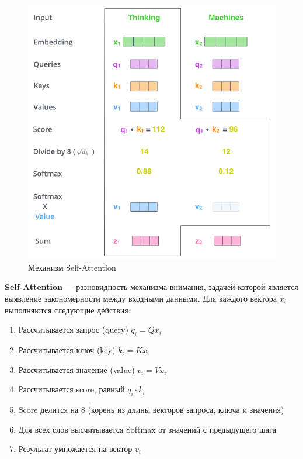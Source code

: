 \begin{figure}
    \centering
    \includegraphics[scale=0.5]{images/self-attention.png}
    \caption{Механизм Self-Attention}
\end{figure}

\begin{definition}
    \textbf{Self-Attention} --- разновидность механизма внимания, задачей которой является выявление закономерности между входными данными. Для каждого вектора $x_i$ выполняются следующие действия:
    \begin{enumerate}
        \item Рассчитывается запрос (query) $q_i=Qx_i$
        \item Рассчитывается ключ (key) $k_i=Kx_i$
        \item Рассчитывается значение (value) $v_i=Vx_i$
        \item Рассчитывается score, равный $q_i\cdot k_i$
        \item Score делится на 8 (корень из длины векторов запроса, ключа и значения)
        \item Для всех слов высчитывается Softmax от значений с предыдущего шага
        \item Результат умножается на вектор $v_i$
    \end{enumerate}
\end{definition}

